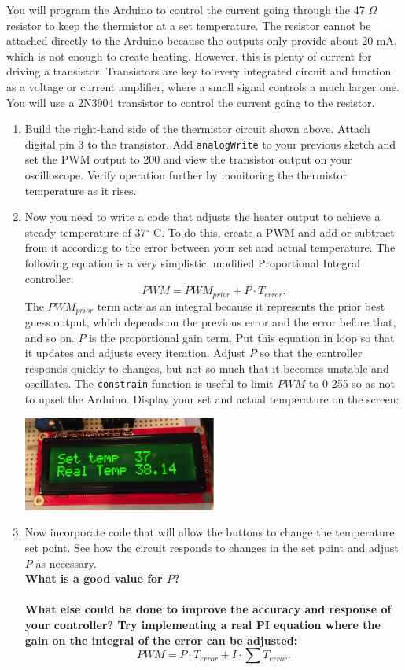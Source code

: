 \documentclass[12pt]{article}
\begin{document}
\par You will program the Arduino to control the current going through 
the 47 $\Omega$ resistor to keep the thermistor at a set temperature. 
The resistor cannot be attached directly to the Arduino because the outputs only 
provide about 20 mA, which is not enough to create heating. 
However, this is plenty of current for driving a transistor. 
Transistors are key to every integrated circuit and function as a voltage or current amplifier, 
where a small signal controls a much larger one. 
You will use a 2N3904 transistor to control the current going to the resistor.

\begin{enumerate}
\item Build the right-hand side of the thermistor circuit shown above. 
Attach digital pin 3 to the transistor. 
Add \texttt{analogWrite} to your previous sketch and set the PWM output to 200 and view the transistor output on your oscilloscope. 
Verify operation further by monitoring the thermistor temperature as it rises.
\item Now you need to write a code that adjusts the heater output to achieve a steady temperature of 37$^{\circ}$ C. 
To do this, create a PWM and add or subtract from it according to the error between your set and actual temperature. 
The following equation is a very simplistic, modified Proportional Integral controller:
\[
	PWM = PWM_{prior} + P \cdot T_{error}.
\]
The $PWM_{prior}$ term acts as an integral because it represents the prior best guess output, which depends on the previous error and the error before that, and so on. 
$P$ is the proportional gain term. 
Put this equation in loop so that it updates and adjusts every iteration. 
Adjust $P$ so that the controller responds quickly to changes, 
but not so much that it becomes unstable and oscillates. 
The \texttt{constrain} function is useful to limit $PWM$ to 0-255 so as not to upset the Arduino. 
Display your set and actual temperature on the screen:
\begin{center}
\includegraphics[width=0.5\textwidth,trim=0 0 0 0,clip=false]{screentemp.png}
\end{center}
\item Now incorporate code that will allow the buttons to change the temperature set point. 
See how the circuit responds to changes in the set point and adjust $P$ as necessary.\\
{\bf What is a good value for $P$?}\\
\bigskip \bigskip \bigskip \\
{\bf What else could be done to improve the accuracy and response of your controller?
Try implementing a real PI equation where the gain on the integral of the error can be adjusted:}
\[
	PWM = P\cdot T_{error} + I\cdot \sum T_{error}.
\]
\end{enumerate}
\end{document}
